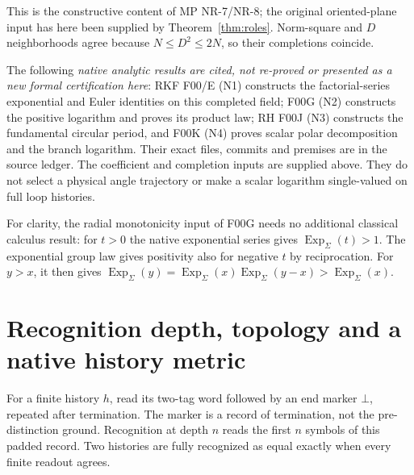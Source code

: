 \documentclass[11pt]{article}
\begin{document}
This is the constructive content of MP NR-7/NR-8; the original oriented-plane
input has here been supplied by Theorem~\ref{thm:roles}. Norm-square and $D$
neighborhoods agree because $N\le D^2\le2N$, so their completions coincide.

The following \emph{native analytic results are cited, not re-proved or
presented as a new formal certification here}: RKF F00/E (N1) constructs the
factorial-series exponential and Euler identities on this completed field;
F00G (N2) constructs the positive logarithm and proves its product law; RH F00J
(N3) constructs the fundamental circular period, and F00K (N4) proves scalar polar
decomposition and the branch logarithm. Their exact files, commits and
premises are in the source ledger. The coefficient and completion inputs
are supplied above. They do not select a physical angle trajectory or make
a scalar logarithm single-valued on full loop histories.

For clarity, the radial monotonicity input of F00G needs no additional
classical calculus result: for $t>0$ the native exponential series gives
$\operatorname{Exp}_\Sigma(t)>1$. The exponential group law gives positivity
also for negative $t$ by reciprocation. For $y>x$, it then gives
$\operatorname{Exp}_\Sigma(y)=\operatorname{Exp}_\Sigma(x)
\operatorname{Exp}_\Sigma(y-x)>\operatorname{Exp}_\Sigma(x)$.

\section{Recognition depth, topology and a native history metric}
\label{sec:history}
For a finite history $h$, read its two-tag word followed by an end marker
$\bot$, repeated after termination. The marker is a record of termination,
not the pre-distinction ground. Recognition at depth $n$ reads the first
$n$ symbols of this padded record. Two histories are fully recognized as
equal exactly when every finite readout agrees.
\end{document}
